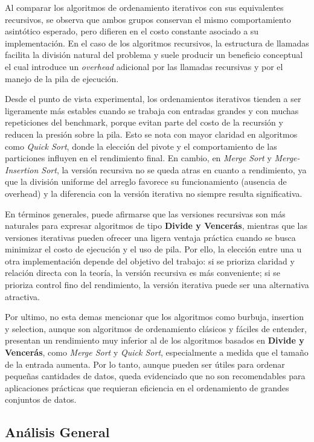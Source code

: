 Al comparar los algoritmos de ordenamiento iterativos con sus equivalentes recursivos, se observa que ambos grupos conservan el mismo comportamiento asintótico esperado, pero difieren en el costo constante asociado a su implementación.  En el caso de los algoritmos recursivos, la estructura de llamadas facilita la división natural del problema y suele producir un beneficio conceptual el cual introduce un \textit{overhead} adicional por las llamadas recursivas y por el manejo de la pila de ejecución.

Desde el punto de vista experimental, los ordenamientos iterativos tienden a ser ligeramente más estables cuando se trabaja con entradas grandes y con muchas repeticiones del benchmark, porque evitan parte del costo de la recursión y reducen la presión sobre la pila.  Esto se nota con mayor claridad en algoritmos como \textit{Quick Sort}, donde la elección del pivote y el comportamiento de las particiones influyen en el rendimiento final.  En cambio, en \textit{Merge Sort} y \textit{Merge-Insertion Sort}, la versión recursiva no se queda atras en cuanto a rendimiento, ya que la división uniforme del arreglo favorece su funcionamiento (ausencia de overhead) y la diferencia con la versión iterativa no siempre resulta significativa.

En términos generales, puede afirmarse que las versiones recursivas son más naturales para expresar algoritmos de tipo \textbf{Divide y Vencerás}, mientras que las versiones iterativas pueden ofrecer una ligera ventaja práctica cuando se busca minimizar el costo de ejecución y el uso de pila.  Por ello, la elección entre una u otra implementación depende del objetivo del trabajo: si se prioriza claridad y relación directa con la teoría, la versión recursiva es más conveniente; si se prioriza control fino del rendimiento, la versión iterativa puede ser una alternativa atractiva.

Por ultimo, no esta demas mencionar que los algoritmos como burbuja, insertion y selection, aunque son algoritmos de ordenamiento clásicos y fáciles de entender, presentan un rendimiento muy inferior al de los algoritmos basados en \textbf{Divide y Vencerás}, como \textit{Merge Sort} y \textit{Quick Sort}, especialmente a medida que el tamaño de la entrada aumenta.  Por lo tanto, aunque pueden ser útiles para ordenar pequeñas cantidades de datos, queda evidenciado que no son recomendables para aplicaciones prácticas que requieran eficiencia en el ordenamiento de grandes conjuntos de datos.

\subsection{Análisis General}

